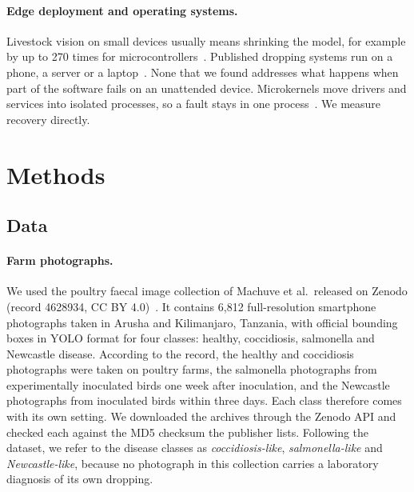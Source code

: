 \documentclass[10pt,twocolumn]{article}
\begin{document}
\paragraph{Edge deployment and operating systems.} Livestock vision on small devices usually means shrinking the
model, for example by up to 270 times for microcontrollers~\cite{zhang2026tinyml}. Published dropping systems run on a
phone, a server or a laptop~\cite{degu2023,sakib2026,dhungana2025}. None that we found addresses what happens when part
of the software fails on an unattended device. Microkernels move drivers and services into isolated processes, so a
fault stays in one process~\cite{klein2009sel4,qnx8sysarch}. We measure recovery directly.

\section{Methods}
\label{sec:methods}

\subsection{Data}
\label{sec:data}

\paragraph{Farm photographs.} We used the poultry faecal image collection of Machuve et al.\ released on Zenodo
(record 4628934, CC BY 4.0)~\cite{machuve2022,machuve2021farm}. It contains 6,812 full-resolution smartphone
photographs taken in Arusha and Kilimanjaro, Tanzania, with official bounding boxes in YOLO format for four classes:
healthy, coccidiosis, salmonella and Newcastle disease. According to the record, the healthy and coccidiosis
photographs were taken on poultry farms, the salmonella photographs from experimentally inoculated birds one week
after inoculation, and the Newcastle photographs from inoculated birds within three days. Each class therefore comes
with its own setting. We downloaded the archives through the Zenodo API and checked each against the MD5 checksum
the publisher lists. Following the dataset, we refer to the disease classes as \emph{coccidiosis-like},
\emph{salmonella-like} and \emph{Newcastle-like}, because no photograph in this collection carries a laboratory
diagnosis of its own dropping.
\end{document}
